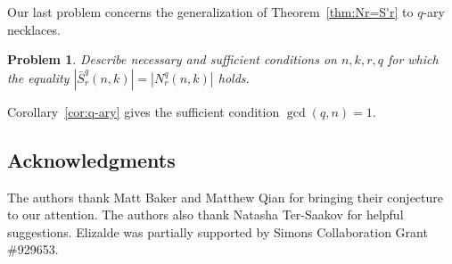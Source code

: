 \documentclass[12pt]{article}
\newcommand{\card}[1]{\left|#1\right|}
\newcommand{\bS}{\bar{S}}
\newtheorem{problem}[theorem]{Problem}
\theoremstyle{definition}
\begin{document}
Our last problem concerns the generalization of Theorem~\ref{thm:Nr=S'r} to $q$-ary necklaces.

\begin{problem}\label{prob:q}
    Describe necessary and sufficient conditions on $n,k,r,q$ for which the equality $\card{\bS_r^q(n,k)}=\card{N_r^q(n,k)}$ holds.
\end{problem}

Corollary~\ref{cor:q-ary} gives the sufficient condition $\gcd(q,n)=1$.

\subsection*{Acknowledgments} 

The authors thank Matt Baker and Matthew Qian for bringing their conjecture to
our attention. The authors also thank Natasha Ter-Saakov for helpful
suggestions. Elizalde was partially supported by Simons Collaboration Grant
\#929653.



\end{document}

